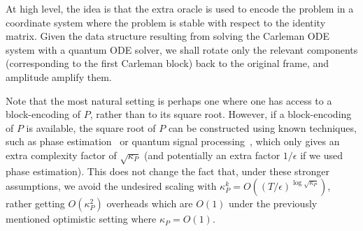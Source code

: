 \documentclass[superscriptaddress,onecolumn,nofootinbib,longbibliography,a4paper,accepted=2026-09-29]{quantumarticle}
\theoremstyle{plain}
\theoremstyle{definition}
\numberwithin{thm}{section}
\numberwithin{assumption}{section}
\numberwithin{lemma}{section}
\numberwithin{prop}{section}
\numberwithin{cor}{section}
\numberwithin{definition}{section}
\numberwithin{rmk}{section}
\numberwithin{equation}{section}
\newcommand{\lrb}[1]{\left ( #1 \right )}
\newcommand{\myO}[1]{O\lrb{#1}}
\begin{document}
At high level, the idea is that the extra oracle is used to encode the problem in a coordinate system where the problem is stable with respect to the identity matrix. Given the data structure resulting from solving the Carleman ODE system with a quantum ODE solver, we shall rotate only the relevant components (corresponding to the first Carleman block) back to the original frame, and amplitude amplify them. 

Note that the most natural setting is perhaps one where one has access to a block-encoding of $P$, rather than to its square root. However, if a block-encoding of $P$ is available, the square root of $P$ can be constructed using known techniques, such as phase estimation~\cite{babbush2023exponential} or quantum signal processing~\cite{gilyen2019quantum}, which only gives an extra complexity factor of $\sqrt{\kappa_P}$ (and potentially an extra factor $1/\epsilon$ if we used phase estimation). This does not change the fact that, under these stronger assumptions, we avoid the undesired scaling with $\kappa_P^k = \myO{(T/\epsilon)^{\log \sqrt{\kappa_P}}}$, rather getting $\myO{\kappa_P^2}$ overheads which are $\myO{1}$ under the previously mentioned optimistic setting where $\kappa_P = \myO{1}$.


\end{document}
